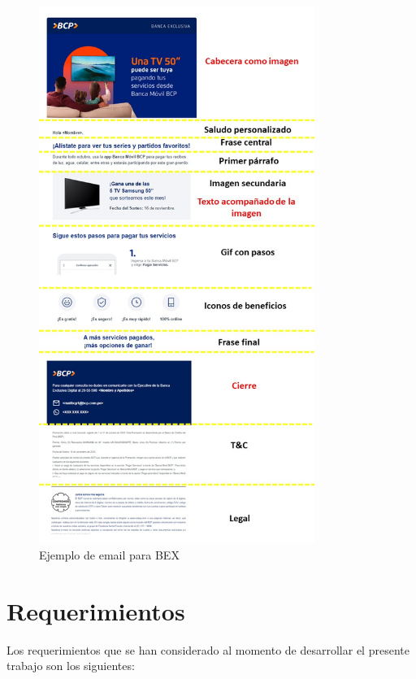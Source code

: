 \begin{figure}[!htpb]
     \centering
     \includegraphics[width=0.8\textwidth]{./Figures/ejemplo_BEX}
     \caption{Ejemplo de email para BEX}
     \label{fig:EjBEX}
\end{figure}


\section{Requerimientos}

Los requerimientos que se han considerado al momento de desarrollar el presente trabajo son los siguientes:

